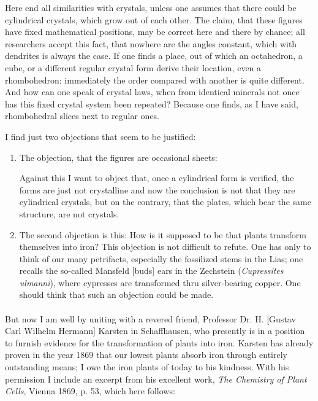 \documentclass[a4paper, 12pt, oneside]{article}
\begin{document}
Here end all similarities with crystals, unless one assumes that there could be cylindrical crystals, which grow out of each other. The claim, that these figures have fixed mathematical positions, may be correct here and there by chance; all researchers accept this fact, that nowhere are the angles constant, which with dendrites is always the case. If one finds a place, out of which an octahedron, a cube, or a different regular crystal form derive their location, even a rhombohedron: immediately the order compared with another is quite different. And how can one speak of crystal laws, when from identical minerals not once has this fixed crystal system been repeated? Because one finds, as I have said, rhombohedral slices next to regular ones.

I find just two objections that seem to be justified:
\begin{enumerate}
    \item The objection, that the figures are occasional sheets:
    
    Against this I want to object that, once a cylindrical form is verified, the forms are just not crystalline and now the conclusion is not that they are cylindrical crystals, but on the contrary, that the plates, which bear the same structure, are not crystals.
    \item The second objection is this: How is it supposed to be that plants transform themselves into iron? This objection is not difficult to refute. One has only to think of our many petrifacts, especially the fossilized stems in the Lias; one recalls the so-called Mansfeld [buds] ears in the Zechstein (\emph{Cupressites ulmanni}), where cypresses are transformed thru silver-bearing copper. One should think that such an objection could be made.
\end{enumerate}
\paragraph*{}
But now I am well by uniting with a revered friend, Professor Dr. H. [Gustav Carl Wilhelm Hermann] Karsten in Schaffhausen, who presently is in a position to furnish evidence for the transformation of plants into iron. Karsten has already proven in the year 1869 that our lowest plants absorb iron through entirely outstanding means; I owe the iron plants of today to his kindness. With his permission I include an excerpt from his excellent work, \emph{The Chemistry of Plant Cells}, Vienna 1869, p. 53, which here follows:
\end{document}
